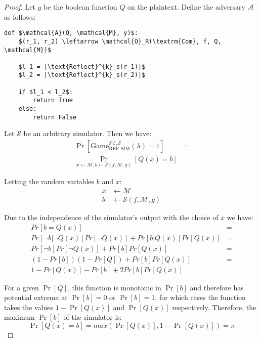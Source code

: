 \begin{proof}

Let $g$ be the boolean function $Q$ on the plaintext. Define the adversary
$\mathcal{A}$ as follows:

\begin{lstlisting}[texcl,mathescape,basicstyle=\small]
def $\mathcal{A}(Q, \mathcal{M}, y)$:
    $(r_1, r_2) \leftarrow \mathcal{O}_R(\textrm{Com}, f, Q, \mathcal{M})$

    $l_1 = |\text{Reflect}^{k}_s(r_1)|$
    $l_2 = |\text{Reflect}^{k}_s(r_2)|$

    if $l_1 < l_2$:
        return True
    else:
        return False
\end{lstlisting}

Let $\mathcal{S}$ be an arbitrary simulator. Then we have:
\begin{align*}
    \Pr[\text{Game}_{\text{REF-SIM}}^{\mathcal{PE},\mathcal{S}}
        (\lambda) = 1] &=\\
    \Pr_{x \leftarrow \mathcal{M}, b \leftarrow \mathcal{S}(f, \mathcal{M}, g)}
        [Q(x) = b]
\end{align*}

Letting the random variables $b$ and $x$:
\begin{align*}
    x &\leftarrow \mathcal{M}\\
    b &\leftarrow \mathcal{S}(f, \mathcal{M}, g)
\end{align*}

Due to the independence of the simulator's output with the choice of $x$ we have:
\begin{align*}
    Pr[b = Q(x)] &=\\
    Pr[\lnot b|\lnot Q(x)]Pr[\lnot Q(x)] + Pr[b|Q(x)]Pr[Q(x)] &=\\
    Pr[\lnot b]Pr[\lnot Q(x)] + Pr[b]Pr[Q(x)] &=\\
    (1 - Pr[b])(1 - Pr[Q]) + Pr[b]Pr[Q(x)] &=\\
    1 - Pr[Q(x)] - Pr[b] + 2Pr[b]Pr[Q(x)]
\end{align*}

For a given $\Pr[Q]$, this function is monotonic in $\Pr[b]$ and therefore has
potential extrema at $\Pr[b] = 0$ or $\Pr[b] = 1$, for which cases the function
takes the values $1 - \Pr[Q(x)]$ and $\Pr[Q(x)]$ respectively. Therefore, the
maximum $\Pr[b]$ of the simulator is:
\begin{equation*}
    \Pr[Q(x) = b] = max(\Pr[Q(x)], 1 - \Pr[Q(x)]) = \pi
\end{equation*}


\end{proof}
